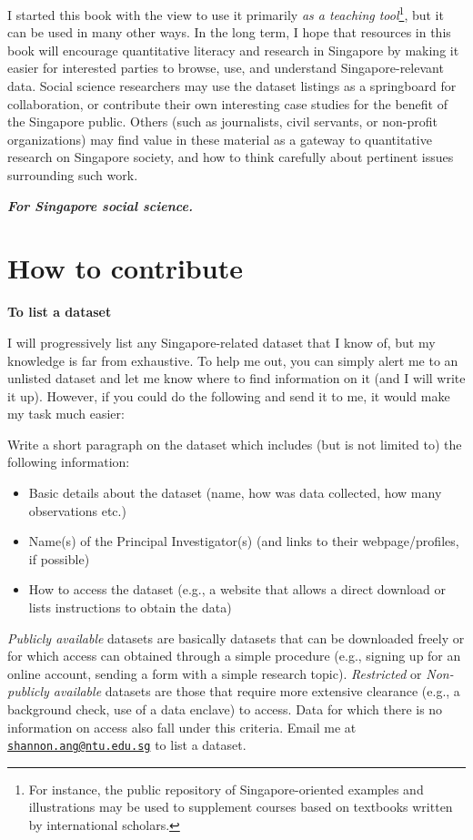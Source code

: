 \documentclass[openany]{book}
\providecommand{\tightlist}{%
  \setlength{\itemsep}{0pt}\setlength{\parskip}{0pt}}
\let\rmarkdownfootnote\footnote%
\def\footnote{\protect\rmarkdownfootnote}
\begin{document}
I started this book with the view to use it primarily \emph{as a
teaching tool}\footnote{For instance, the public repository of
  Singapore-oriented examples and illustrations may be used to
  supplement courses based on textbooks written by international
  scholars.}, but it can be used in many other ways. In the long term, I
hope that resources in this book will encourage quantitative literacy
and research in Singapore by making it easier for interested parties to
browse, use, and understand Singapore-relevant data. Social science
researchers may use the dataset listings as a springboard for
collaboration, or contribute their own interesting case studies for the
benefit of the Singapore public. Others (such as journalists, civil
servants, or non-profit organizations) may find value in these material
as a gateway to quantitative research on Singapore society, and how to
think carefully about pertinent issues surrounding such work.

\textbf{\emph{For Singapore social science.}}

\section*{How to contribute}\label{how-to-contribute}

\textbf{To list a dataset}

I will progressively list any Singapore-related dataset that I know of,
but my knowledge is far from exhaustive. To help me out, you can simply
alert me to an unlisted dataset and let me know where to find
information on it (and I will write it up). However, if you could do the
following and send it to me, it would make my task much easier:

Write a short paragraph on the dataset which includes (but is not
limited to) the following information:

\begin{itemize}
\tightlist
\item
  Basic details about the dataset (name, how was data collected, how
  many observations etc.)
\item
  Name(s) of the Principal Investigator(s) (and links to their
  webpage/profiles, if possible)
\item
  How to access the dataset (e.g., a website that allows a direct
  download or lists instructions to obtain the data)
\end{itemize}

\emph{Publicly available} datasets are basically datasets that can be
downloaded freely or for which access can obtained through a simple
procedure (e.g., signing up for an online account, sending a form with a
simple research topic). \emph{Restricted} or \emph{Non-publicly
available} datasets are those that require more extensive clearance
(e.g., a background check, use of a data enclave) to access. Data for
which there is no information on access also fall under this criteria.
Email me at
\href{mailto:shannon.ang@ntu.edu.sg}{\nolinkurl{shannon.ang@ntu.edu.sg}}
to list a dataset.
\end{document}
